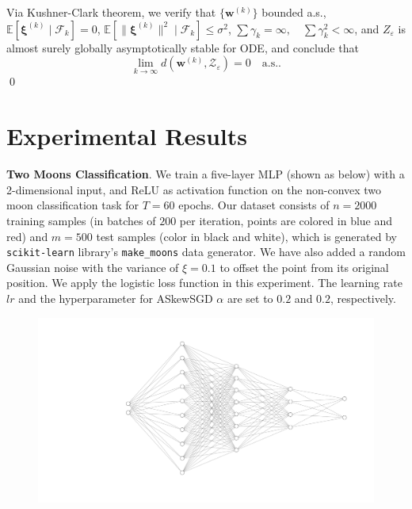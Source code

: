 \documentclass[10pt,a4paper]{article}
\begin{document}
Via Kushner-Clark theorem, we verify that $\{\mathbf{w}^{(k)}\}$ bounded a.s., 
$\mathbb{E}[\bm{\xi}^{(k)} \mid \mathcal{F}_k] = 0$, $\mathbb{E}[\lVert \bm{\xi}^{(k)} \rVert^2 \mid \mathcal{F}_k] \leq \sigma^2$, $\sum \gamma_k = \infty, \quad \sum \gamma_k^2 < \infty$, and $Z_\varepsilon$ is almost surely globally asymptotically stable for ODE, and conclude that
\[
\lim_{k \to \infty} d(\mathbf{w}^{(k)}, \mathcal{Z}_\varepsilon) = 0 \quad \text{a.s.}.
\]\qed






\newpage
\section{Experimental Results}

\textbf{Two Moons Classification}. We train a five-layer MLP (shown as below) with a 2-dimensional input, and ReLU as activation function on the non-convex two moon classification task for $T=60$ epochs. Our dataset consists of $n=2000$ training samples (in batches of $200$ per iteration, points are colored in blue and red) and $m=500$ test samples (color in black and white), which is generated by \texttt{scikit-learn} library's \texttt{make\_moons} data generator. We have also added a random Gaussian noise with the variance of $\xi=0.1$ to offset the point from its original position. We apply the logistic loss function in this experiment. The learning rate $lr$ and the hyperparameter for ASkewSGD $\alpha$ are set to $0.2$ and $0.2$, respectively.
\begin{figure}[H]
  \centering
  \includegraphics[width=0.6\linewidth]{nn.png}
\end{figure}
\end{document}
